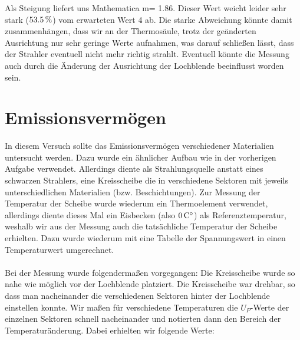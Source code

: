 \documentclass[12pt,twoside,a4paper]{article}
\begin{document}
Als Steigung liefert uns Mathematica m= 1.86. Dieser Wert weicht leider sehr stark ($\unit[53.5]{\%}$) vom erwarteten Wert 4 ab. Die starke Abweichung könnte damit zusammenhängen, dass wir an der Thermosäule, trotz der geänderten Ausrichtung nur sehr geringe Werte aufnahmen, was darauf schließen lässt, dass der Strahler eventuell nicht mehr richtig strahlt. Eventuell könnte die Messung auch durch die Änderung der Ausrichtung der Lochblende beeinflusst worden sein.

\section{Emissionsvermögen}

In diesem Versuch sollte das Emissionsvermögen verschiedener Materialien untersucht werden. Dazu wurde ein ähnlicher Aufbau wie in der vorherigen Aufgabe verwendet. Allerdings diente als Strahlungsquelle anstatt eines schwarzen Strahlers, eine Kreisscheibe die in verschiedene Sektoren mit jeweils unterschiedlichen Materialien (bzw. Beschichtungen). Zur Messung der Temperatur der Scheibe wurde wiederum ein Thermoelement verwendet, allerdings diente dieses Mal ein Eisbecken (also $\unit[0]{C^\circ}$) als Referenztemperatur, weshalb wir aus der Messung auch die tatsächliche Temperatur der Scheibe erhielten. Dazu wurde wiederum mit eine Tabelle der Spannungswert in einen Temperaturwert umgerechnet.\\ \\
Bei der Messung wurde folgendermaßen vorgegangen: Die Kreisscheibe wurde so nahe wie möglich vor der Lochblende platziert. Die Kreisscheibe war drehbar, so dass man nacheinander die verschiedenen Sektoren hinter der Lochblende einstellen konnte. Wir maßen für verschiedene Temperaturen die $U_P$-Werte der einzelnen Sektoren schnell nacheinander und notierten dann den Bereich der Temperaturänderung. Dabei erhielten wir folgende Werte:
\end{document}
